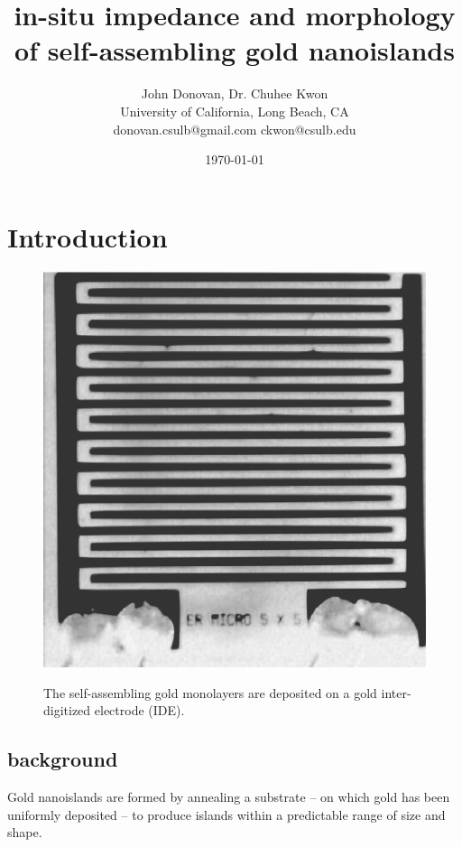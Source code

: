 \documentclass[12pt,oneside,english]{article}
\begin{document}
\sffamily

        \title{in-situ impedance and morphology of self-assembling gold nanoislands}

	\author{John Donovan, Dr. Chuhee Kwon\\
	University of California, Long Beach, CA\\
	{\small donovan.csulb@gmail.com ckwon@csulb.edu}}
	
        \date{\today}

	\maketitle


        \section{Introduction}

	\begin{figure}
	\includegraphics[scale=0.4]{images/IDE.eps} \label{f:IDE}
	\caption{The self-assembling gold monolayers are deposited on a gold inter-digitized electrode (IDE).}
	\end{figure}
	
	\subsection{background}
	Gold nanoislands  are formed by annealing a substrate -- on which gold has been uniformly deposited -- to produce islands within a predictable range of size and shape.
\end{document}
